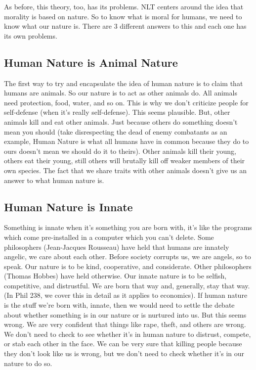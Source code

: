 As before, this theory, too, has its problems. NLT centers around the idea that morality is based on nature. So to know what is moral for humans, we need to know what our nature is. There are 3 different answers to this and each one has its own problems.

\subsection{Human Nature is Animal Nature}

The first way to try and encapsulate the idea of human nature is to claim that humans are animals. So our nature is to act as other animals do. All animals need protection, food, water, and so on. This is why we don’t criticize people for self-defense (when it’s really self-defense). This seems plausible. But, other animals kill and eat other animals. Just because others do something doesn’t mean you should (take disrespecting the dead of enemy combatants as an example, Human Nature is what all humans have in common because they do to ours doesn’t mean we should do it to theirs). Other animals kill their young, others eat their young, still others will brutally kill off weaker members of their own species. The fact that we share traits with other animals doesn’t give us an answer to what human nature is.

\subsection{Human Nature is Innate}

Something is innate when it’s something you are born with, it’s like the programs which come pre-installed in a computer which you can’t delete. Some philosophers (Jean-Jacques Rousseau) have held that humans are innately angelic, we care about each other. Before society corrupts us, we are angels, so to speak. Our nature is to be kind, cooperative, and considerate. Other philosophers (Thomas Hobbes) have held otherwise. Our innate nature is to be selfish, competitive, and distrustful. We are born that way and, generally, stay that way. (In Phil 238, we cover this in detail as it applies to economics). If human nature is the stuff we’re born with, innate, then we would need to settle the debate about whether something is in our nature or is nurtured into us. But this seems wrong. We are very confident that things like rape, theft, and others are wrong. We don’t need to check to see whether it’s in human nature to distrust, compete, or stab each other in the face.  We can be very sure that killing people because they don’t look like us is wrong, but we don’t need to check whether it’s in our nature to do so.

